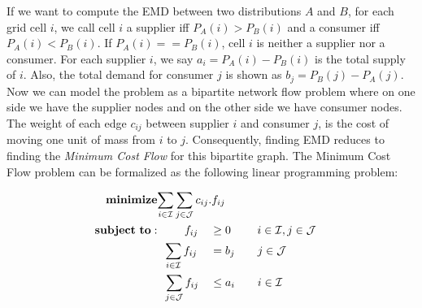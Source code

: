 If we want to compute the EMD between two distributions $A$ and $B$, for each grid cell $i$, we call cell $i$ a supplier iff $P_A(i) > P_B(i)$ and a consumer iff $P_A(i) < P_B(i)$. If $P_A(i) == P_B(i)$, cell $i$ is neither a supplier nor a consumer. For each supplier $i$, we say $a_i = P_A(i) - P_B(i)$ is the total supply of $i$. Also, the total demand for consumer $j$ is shown as $b_j = P_B(j) - P_A(j)$. Now we can model the problem as a bipartite network flow problem where on one side we have the supplier nodes and on the other side we have consumer nodes. The weight of each edge $c_{ij}$ between supplier $i$ and consumer $j$, is the cost of moving one unit of mass from $i$ to $j$.  Consequently, finding EMD reduces to finding the \textit{Minimum Cost Flow} for this bipartite graph. The Minimum Cost Flow problem can be formalized as the following linear programming problem:


\setcounter{equation}{0}
\begin{alignat}{2}
\mathbf{minimize}&\mathrlap{\sum_{i \in \mathcal{I}} \sum_{j \in \mathcal{J}} c_{ij}.f_{ij}} \notag\\
\mathbf{subject\ to:}&\phantom{{a}={a}} f_{ij} && \geq 0 \ \quad\quad i \in \mathcal{I}, j \in \mathcal{J}\\
&\phantom{{a}}\sum_{i \in \mathcal{I}} f_{ij} &&= b_j \quad\quad j \in \mathcal{J}\\
&\phantom{{a}}\sum_{j \in \mathcal{J}} f_{ij} &&\leq a_i \quad\quad i \in \mathcal{I}
\end{alignat}



